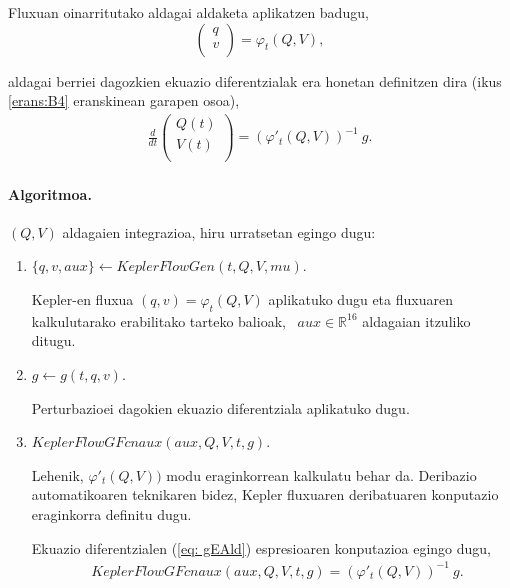 Fluxuan oinarritutako aldagai aldaketa aplikatzen badugu,
\begin{equation}
\left(\begin{array}{c}
                q  \\
                v  \\
\end{array}\right)= \varphi_t(Q,V),
\end{equation}

aldagai berriei dagozkien ekuazio diferentzialak era honetan definitzen dira (ikus \ref{erans:B4} eranskinean garapen osoa),
\begin{align}
\label{eq: gEAld}
\frac{d}{dt}\left(\begin{array}{c}
                Q(t)  \\
                V(t)  \\
\end{array}\right) =(\varphi'_t(Q,V))^{-1} \ g.
 \end{align}


\paragraph*{Algoritmoa.}
$(Q,V)$ aldagaien integrazioa, hiru urratsetan egingo dugu:
\begin{enumerate}
\item $\{q,v,aux\} \leftarrow KeplerFlowGen (t,Q,V,mu)$.

Kepler-en fluxua $(q,v)= \varphi_t(Q,V)$ aplikatuko dugu eta fluxuaren kalkulutarako erabilitako tarteko balioak, ~$aux\in \mathbb{R}^{16}$ aldagaian itzuliko ditugu. 

\item $g \leftarrow g(t,q,v)$.

Perturbazioei dagokien ekuazio diferentziala aplikatuko dugu.

\item $KeplerFlowGFcnaux(aux,Q,V,t,g)$.

Lehenik, $\varphi'_t(Q,V))$ modu eraginkorrean kalkulatu behar da. Deribazio automatikoaren teknikaren bidez, Kepler fluxuaren deribatuaren konputazio eraginkorra definitu dugu. 

Ekuazio diferentzialen (\ref{eq: gEAld}) espresioaren konputazioa egingo dugu,   
\begin{align*}
&KeplerFlowGFcnaux(aux,Q,V,t,g)= ( \varphi'_t(Q,V))^{-1} \ g.
\end{align*}

\end{enumerate} 


